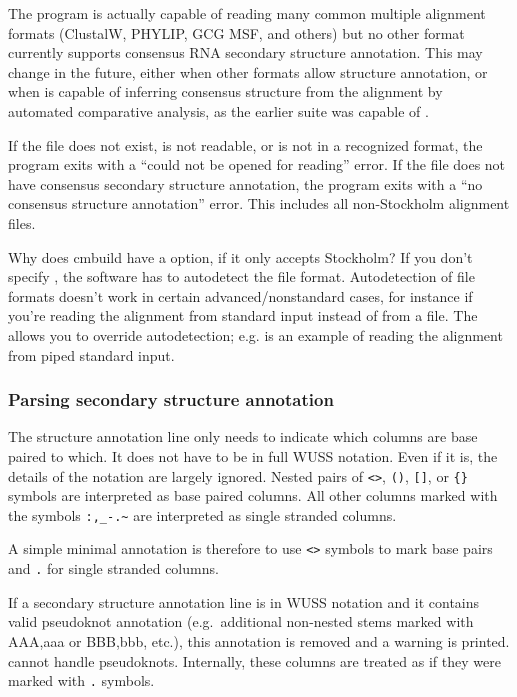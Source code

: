 The program is actually capable of reading many common multiple
alignment formats (ClustalW, PHYLIP, GCG MSF, and others) but no other
format currently supports consensus RNA secondary structure
annotation. This may change in the future, either when other formats
allow structure annotation, or when  is capable of
inferring consensus structure from the alignment by automated
comparative analysis, as the earlier  suite was capable
of \cite{Eddy94}. 

If the file does not exist, is not readable, or is not in a recognized
format, the program exits with a ``could not be opened for reading''
error. If the file does not have consensus secondary structure
annotation, the program exits with a ``no consensus structure
annotation'' error. This includes all non-Stockholm alignment files.

\begin{srefaq}{Why does cmbuild have a  option, if it only
accepts Stockholm?} If you don't specify , the
software has to autodetect the file format. Autodetection of file
formats doesn't work in certain advanced/nonstandard cases, for
instance if you're reading the alignment from standard input instead
of from a file. The  allows you to override
autodetection; e.g.  is an example of reading the alignment from piped standard
input.
\end{srefaq}

\subsubsection{Parsing secondary structure annotation}

The structure annotation line only needs to indicate which columns are
base paired to which. It does not have to be in full WUSS notation.
Even if it is, the details of the notation are largely ignored.
Nested pairs of \verb+<>+, \verb+()+, \verb+[]+, or \verb+{}+ symbols
are interpreted as base paired columns. All other columns marked with
the symbols \verb+:,_-.~+ are interpreted as single stranded columns.

A simple minimal annotation is therefore to use \verb+<>+ symbols to
mark base pairs and \verb+.+ for single stranded columns.

If a secondary structure annotation line is in WUSS notation and it
contains valid pseudoknot annotation (e.g.\ additional non-nested
stems marked with AAA,aaa or BBB,bbb, etc.), this annotation is
removed and a warning is printed.  cannot handle
pseudoknots. Internally, these columns are treated as if they were
marked with \verb+.+ symbols.

